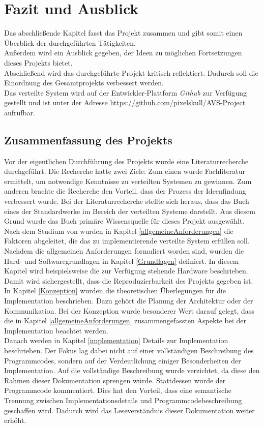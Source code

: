 \chapter{Fazit und Ausblick}
\label{fazit}
Das abschließende Kapitel fasst das Projekt zusammen und gibt somit einen Überblick der durchgeführten Tätigkeiten.\\
 Außerdem wird ein Ausblick gegeben, der Ideen zu möglichen Fortsetzungen dieses Projekts bietet. \\
 Abschließend wird das durchgeführte Projekt kritisch reflektiert. Dadurch soll die Einordnung des Gesamtprojekts verbessert werden.\\
 
Das verteilte System wird auf der Entwickler-Plattform \emph{Github} zur Verfügung gestellt und ist unter der Adresse \url{https://github.com/pixelskull/AVS-Project} aufrufbar.

\section{Zusammenfassung des Projekts}
Vor der eigentlichen Durchführung des Projekts wurde eine Literaturrecherche durchgeführt. Die Recherche hatte zwei Ziele: Zum einen wurde Fachliteratur ermittelt, um notwendige Kenntnisse zu verteilten Systemen zu gewinnen. Zum anderen brachte die Recherche den Vorteil, dass der Prozess der Ideenfindung verbessert wurde. Bei der Literaturrecherche stellte sich heraus, dass das Buch \citep{tanenbaum} eines der Standardwerke im Bereich der verteilten Systeme darstellt. Aus diesem Grund wurde das Buch primäre Wissensquelle für dieses Projekt ausgewählt. \\
Nach dem Studium von \citep{tanenbaum} wurden in Kapitel \ref{allgemeineAnforderungen} die Faktoren abgeleitet, die das zu implementierende verteilte System erfüllen soll. \\
Nachdem die allgemeinen Anforderungen formuliert worden sind, wurden die Hard- und Softwaregrundlagen in Kapitel \ref{Grundlagen} definiert. In diesem Kapitel wird beispielsweise die zur Verfügung stehende Hardware beschrieben. Damit wird sichergestellt, dass die Reproduzierbarkeit des Projekts gegeben ist. \\
In Kapitel \ref{Konzeption} wurden die theoretischen Überlegungen für die Implementation beschrieben. Dazu gehört die Planung der Architektur oder der Kommunikation. Bei der Konzeption wurde besonderer Wert darauf gelegt, dass die in Kapitel \ref{allgemeineAnforderungen} zusammengefassten Aspekte bei der Implementation beachtet werden. \\
Danach werden in Kapitel \ref{implementation} Details zur Implementation beschrieben. Der Fokus lag dabei nicht auf einer vollständigen Beschreibung des Programmcodes, sondern auf der Verdeutlichung einiger Besonderheiten der Implementation. Auf die vollständige Beschreibung wurde verzichtet, da diese den Rahmen dieser Dokumentation sprengen würde. Stattdessen wurde der Programmcode kommentiert. Dies hat den Vorteil, dass eine semantische Trennung zwischen Implementationsdetails und Programmcodebeschreibung geschaffen wird. Dadurch wird das Leseverständnis dieser Dokumentation weiter erhöht. 

